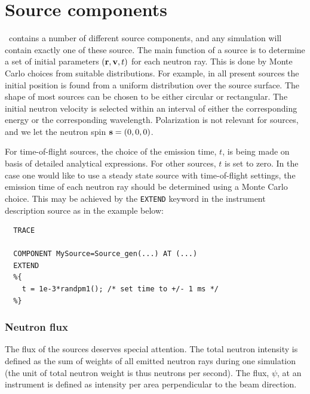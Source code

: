 
\chapter{Source components}
\label{c:source}

\MCS\ contains a number of different source components,
and any simulation will contain exactly one of these source.
The main function of a source is to determine a set of initial
parameters $({\bf r}, {\bf v}, t)$
for each neutron ray. This is done by Monte Carlo choices from
suitable distributions. For example, in all present sources 
the initial position is
found from a uniform distribution over the source surface.
The shape of most sources can be chosen to be either circular or rectangular.
The initial neutron velocity is selected within an interval
of either the corresponding energy or the corresponding wavelength.
Polarization is not relevant for sources,
and we let the neutron spin ${\bf s}=(0,0,0)$.

For time-of-flight sources, the choice of the emission time, $t$,
is being made on basis of detailed analytical expressions.
For other sources, $t$ is set to zero.
In the case one would like to use a steady state source 
with time-of-flight settings, 
the emission time of each neutron ray should be determined using 
a Monte Carlo choice. This may be achieved by 
the \verb+EXTEND+ keyword in the instrument description source
as in the example below:

\begin{verbatim}
  TRACE

  COMPONENT MySource=Source_gen(...) AT (...)
  EXTEND
  %{
    t = 1e-3*randpm1(); /* set time to +/- 1 ms */
  %}
\end{verbatim}

\subsection{Neutron flux}
\label{s:neutron-flux}
The flux of the sources deserves special attention. The total neutron
intensity is defined as the sum of weights of all emitted neutron rays
during one simulation
(the unit of total neutron weight is thus neutrons per second).
The flux, $\psi$, at an instrument is defined as intensity per area perpendicular 
to the beam direction.

